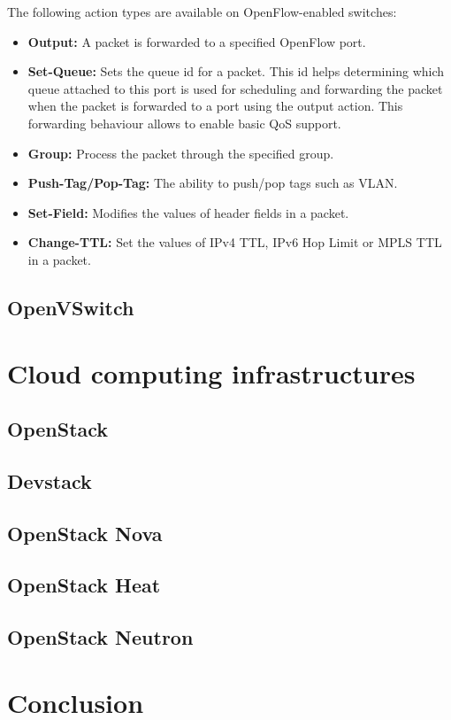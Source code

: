 The following action types are available on OpenFlow-enabled switches:
\begin{itemize}
\item \textbf{Output:} A packet is forwarded to a specified OpenFlow port.
\item \textbf{Set-Queue:} Sets the queue id for a packet. This id helps determining which queue attached to this port is used for scheduling and forwarding the packet when the packet is forwarded to a port using the output action. This forwarding behaviour allows to enable basic QoS support.
\item \textbf{Group:} Process the packet through the specified group.
\item \textbf{Push-Tag/Pop-Tag:} The ability to push/pop tags such as VLAN.
\item \textbf{Set-Field:} Modifies the values of header fields in a packet.
\item \textbf{Change-TTL:} Set the values of IPv4 TTL, IPv6 Hop Limit or MPLS TTL in a packet.
\end{itemize} 


\subsection{OpenVSwitch}


\section{Cloud computing infrastructures}

\subsection{OpenStack}

\subsection{Devstack}

\subsection{OpenStack Nova}

\subsection{OpenStack Heat}

\subsection{OpenStack Neutron}


\section{Conclusion}